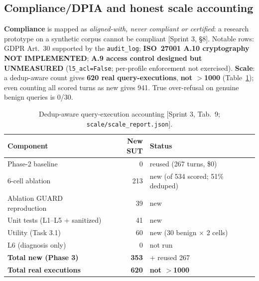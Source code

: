 \documentclass[11pt,a4paper]{article}
\newcommand{\code}[1]{\texttt{\small #1}}
\newcommand{\src}[1]{{\footnotesize\textcolor{gray!55!black}{[#1]}}}
\begin{document}
\subsection{Compliance/DPIA and honest scale accounting}
\textbf{Compliance} is mapped as \emph{aligned-with, never compliant or certified}: a research prototype
on a synthetic corpus cannot be compliant \src{Sprint 3, \S8}. Notable rows: GDPR Art.~30 supported by
the \code{audit\_log}; \textbf{ISO~27001 A.10 cryptography NOT IMPLEMENTED}; \textbf{A.9 access control
designed but UNMEASURED} (\code{l5\_acl=False}; per-profile enforcement not exercised). \textbf{Scale}:
a dedup-aware count gives \textbf{620 real query-executions}, \textbf{not $>$1000} (Table~\ref{tab:scale});
even counting all scored turns as new gives 941. True over-refusal on genuine benign queries is 0/30.

\begin{table}[h]
\centering
\caption{Dedup-aware query-execution accounting \src{Sprint 3, Tab.~9; \code{scale/scale\_report.json}}.}
\label{tab:scale}
\begin{tabular}{lrl}
\toprule
\textbf{Component} & \textbf{New SUT} & \textbf{Status}\\
\midrule
Phase-2 baseline & 0 & reused (267 turns, \$0)\\
6-cell ablation & 213 & new (of 534 scored; 51\% deduped)\\
Ablation GUARD reproduction & 39 & new\\
Unit tests (L1--L5 + sanitized) & 41 & new\\
Utility (Task 3.1) & 60 & new (30 benign $\times$ 2 cells)\\
L6 (diagnosis only) & 0 & not run\\
\midrule
\textbf{Total new (Phase 3)} & \textbf{353} & + reused 267\\
\textbf{Total real executions} & \textbf{620} & \textbf{not $>$1000}\\
\bottomrule
\end{tabular}
\end{table}
\end{document}
